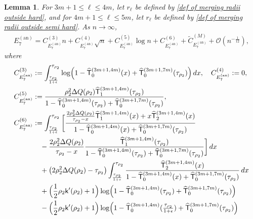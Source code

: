 \documentclass[a4paper]{article}
\newtheorem{lemma}[theorem]{Lemma}
\numberwithin{equation}{section}
\begin{document}
\begin{lemma}\label{lemma:asymptotic expansion E7 annulus}
For $3m+1\le\ell\le4m$, let $r_\ell$ be defined by
\eqref{def of merging radii outside hard}, and for
$4m+1\le\ell\le5m$, let $r_\ell$ be defined by
\eqref{def of merging radii outside semi hard}.  As $n\to\infty$,
 \begin{align}
    E_{7}^{(\mathrm{an})}
    =
    C_{E_{7}^{(\mathrm{an})}}^{(3)}n 
 +C_{E_{7}^{(\mathrm{an})}}^{(4)}\sqrt{n}
 +C_{E_{7}^{(\mathrm{an})}}^{(5)}\log n
 +C_{E_{7}^{(\mathrm{an})}}^{(6)}
 +\widetilde{C}_{E_{7}^{(\mathrm{an})}}^{(M)}
 +\mathcal{O}(n^{-\frac{1}{12}}),
\end{align}  
where 
\begin{align*}
C_{E_{7}^{(\mathrm{an})}}^{(3)}
&:=
\int_{\frac{\tau_{\rho_2}}{1+\epsilon}}^{\tau_{\rho_2}}
\log\Bigl(1-\widehat{\mathsf{T}}_0^{(3m+1,4m)}(x)+\widehat{\mathsf{T}}_0^{(3m+1,7m)}(\tau_{\rho_2})\Bigr)\,dx,
\quad
C_{E_{7}^{(\mathrm{an})}}^{(4)}
:=0,
\\
C_{E_{7}^{(\mathrm{an})}}^{(5)}
&:=\frac{\rho_2^2\Delta Q(\rho_2)\widehat{\mathsf{T}}_{1}^{(3m+1,4m)}(\tau_{\rho_2})}{1-\widehat{\mathsf{T}}_0^{(3m+1,4m)}(\tau_{\rho_2})+\widehat{\mathsf{T}}_0^{(3m+1,7m)}(\tau_{\rho_2})},
\\
C_{E_{7}^{(\mathrm{an})}}^{(6)}
&:=
\int_{\frac{\tau_{\rho_2}}{1+\epsilon}}^{\tau_{\rho_2}}
\bigg[
\frac{\frac{2\rho_2^2\Delta Q(\rho_2)}{\tau_{\rho_2}-x}
\widehat{\mathsf{T}}_{1}^{(3m+1,4m)}(x)
+x\widehat{\mathsf{T}}_{2}^{(3m+1,4m)}(x)}{1-\widehat{\mathsf{T}}_0^{(3m+1,4m)}(x)+\widehat{\mathsf{T}}_0^{(3m+1,7m)}(\tau_{\rho_2})}
\\
&\quad 
-\frac{2\rho_2^2\Delta Q(\rho_2)}{\tau_{\rho_2}-x}
\frac{
\widehat{\mathsf{T}}_{1}^{(3m+1,4m)}(\tau_{\rho_2})}{1-\widehat{\mathsf{T}}_0^{(3m+1,4m)}(\tau_{\rho_2})+\widehat{\mathsf{T}}_0^{(3m+1,7m)}(\tau_{\rho_2})}
\bigg] \,dx 
\\
&\quad 
+\bigl( 
2\rho_2^2\Delta Q(\rho_2)-\tau_{\rho_2}
\bigr)\int_{\frac{\tau_{\rho_2}}{1+\epsilon}}^{\tau_{\rho_2}}
\frac{\widehat{\mathsf{T}}_{2}^{(3m+1,4m)}(x)}{1-\widehat{\mathsf{T}}_0^{(3m+1,4m)}(x)+\widehat{\mathsf{T}}_0^{(3m+1,7m)}(\tau_{\rho_2})}\,dx
\\
&
\quad
+
\Bigl(\frac{1}{2}\rho_2\mathsf{k}'(\rho_2)+1\Bigr)
\log\Bigl(1-\widehat{\mathsf{T}}_0^{(3m+1,4m)}(\tau_{\rho_2})+\widehat{\mathsf{T}}_0^{(3m+1,7m)}(\tau_{\rho_2})\Bigr)
\\
&\quad
-
\Bigl(\frac{1}{2}\rho_2\mathsf{k}'(\rho_2)+1\Bigr)
\log\Bigl(1-\widehat{\mathsf{T}}_0^{(3m+1,4m)}(\tfrac{\tau_{\rho_2}}{1+\epsilon})+\widehat{\mathsf{T}}_0^{(3m+1,7m)}(\tau_{\rho_2})\Bigr)

\end{align*}
\end{lemma}
\end{document}
